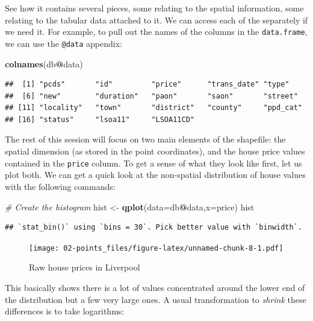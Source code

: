 \documentclass[]{book}
\newenvironment{Shaded}{\begin{snugshade}}{\end{snugshade}}
\newcommand{\CommentTok}[1]{\textcolor[rgb]{0.56,0.35,0.01}{\textit{#1}}}
\newcommand{\DataTypeTok}[1]{\textcolor[rgb]{0.13,0.29,0.53}{#1}}
\newcommand{\KeywordTok}[1]{\textcolor[rgb]{0.13,0.29,0.53}{\textbf{#1}}}
\newcommand{\NormalTok}[1]{#1}
\newcommand{\OperatorTok}[1]{\textcolor[rgb]{0.81,0.36,0.00}{\textbf{#1}}}
\newcommand{\StringTok}[1]{\textcolor[rgb]{0.31,0.60,0.02}{#1}}
\begin{document}
See how it contains several pieces, some relating to the spatial information, some relating to the tabular data attached to it. We can access each of the separately if we need it. For example, to pull out the names of the columns in the \texttt{data.frame}, we can use the \texttt{@data} appendix:

\begin{Shaded}
\begin{Highlighting}[]
\KeywordTok{colnames}\NormalTok{(db}\OperatorTok{@}\NormalTok{data)}
\end{Highlighting}
\end{Shaded}

\begin{verbatim}
##  [1] "pcds"       "id"         "price"      "trans_date" "type"      
##  [6] "new"        "duration"   "paon"       "saon"       "street"    
## [11] "locality"   "town"       "district"   "county"     "ppd_cat"   
## [16] "status"     "lsoa11"     "LSOA11CD"
\end{verbatim}

The rest of this session will focus on two main elements of the shapefile: the spatial dimension (as stored in the point coordinates), and the house price values contained in the \texttt{price} column. To get a sense of what they look like first, let us plot both. We can get a quick look at the non-spatial distribution of house values with the following commands:

\begin{Shaded}
\begin{Highlighting}[]
\CommentTok{# Create the histogram}
\NormalTok{hist <-}\StringTok{ }\KeywordTok{qplot}\NormalTok{(}\DataTypeTok{data=}\NormalTok{db}\OperatorTok{@}\NormalTok{data,}\DataTypeTok{x=}\NormalTok{price)}
\NormalTok{hist}
\end{Highlighting}
\end{Shaded}

\begin{verbatim}
## `stat_bin()` using `bins = 30`. Pick better value with `binwidth`.
\end{verbatim}

\begin{figure}
\centering
\texttt{[image: 02-points\_files/figure-latex/unnamed-chunk-8-1.pdf]}
\caption{\label{fig:unnamed-chunk-8}Raw house prices in Liverpool}
\end{figure}

This basically shows there is a lot of values concentrated around the lower end of the distribution but a few very large ones. A usual transformation to \emph{shrink} these differences is to take logarithms:
\end{document}
